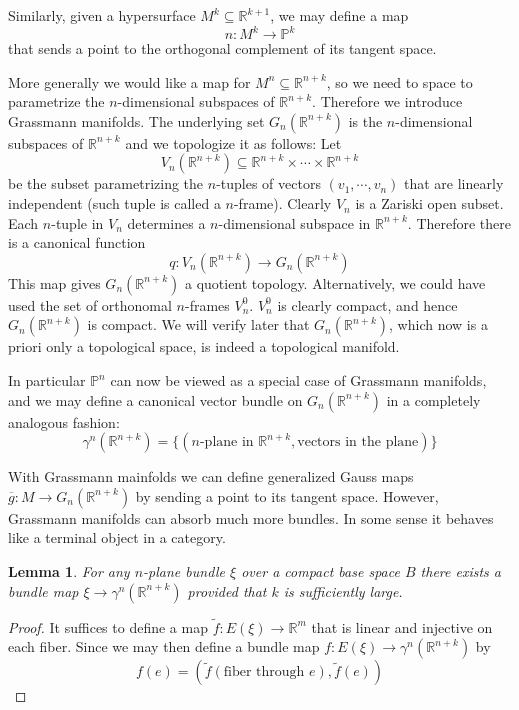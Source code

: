 \documentclass[12pt]{article}
\theoremstyle{plain}
\newtheorem{lemma}[equation]{Lemma}
\theoremstyle{definition}
\newcommand{\IP}{\mathbb{P}}
\newcommand{\IR}{\mathbb{R}}
\newcommand{\<}{\langle}
\renewcommand{\>}{\rangle}
\def\wt{\widetilde}
\newcommand{\wb}{\overline}
\newcommand{\tG}{G_n(\IR^{n + k})}
\begin{document}
Similarly, given a hypersurface $M^k \subseteq \IR^{k + 1}$, we may define a map $$ n : M^k \to \IP^k$$ that sends a point to the orthogonal complement of its tangent space. 

More generally we would like a map for $M^n \subseteq \IR^{n + k}$, so we need to space to parametrize the $n$-dimensional subspaces of $\IR^{n + k}$. Therefore we introduce Grassmann manifolds. The underlying set $G_n(\IR^{n + k})$ is the $n$-dimensional subspaces of $\IR^{n + k}$ and we topologize it as follows: Let $$V_n(\IR^{n + k}) \subseteq \IR^{n + k} \times \cdots \times \IR^{n + k}$$ be the subset parametrizing the $n$-tuples of vectors $(v_1, \cdots, v_n)$ that are linearly independent (such tuple is called a $n$-frame). Clearly $V_n$ is a Zariski open subset. Each $n$-tuple in $V_n$ determines a $n$-dimensional subspace in $\IR^{n + k}$. Therefore there is a canonical function 
$$ q : V_n(\IR^{n + k}) \to G_n (\IR^{n + k}) $$ 
This map gives $G_n (\IR^{n + k})$ a quotient topology. Alternatively, we could have used the set of orthonomal $n$-frames $V^0_{n}$. $V^0_{n}$ is clearly compact, and hence $G_n (\IR^{n + k})$ is compact. We will verify later that $G_n (\IR^{n + k})$, which now is a priori only a topological space, is indeed a topological manifold. 

In particular $\IP^n$ can now be viewed as a special case of Grassmann manifolds, and we may define a canonical vector bundle on $G_n(\IR^{n + k})$ in a completely analogous fashion: $$\gamma^n(\IR^{n + k}) = \{ (\text{$n$-plane in }\IR^{n + k}, \text{vectors in the plane}) \}$$ 

With Grassmann mainfolds we can define generalized Gauss maps $\wb{g} : M \to \tG$ by sending a point to its tangent space. However, Grassmann manifolds can absorb much more bundles. In some sense it behaves like a terminal object in a category. 

\begin{lemma}
\label{complemma}
For any $n$-plane bundle $\xi$ over a compact base space $B$ there exists a bundle map $\xi \to \gamma^n(\IR^{n + k})$ provided that $k$ is sufficiently large. 
\end{lemma}
\begin{proof}
It suffices to define a map $\wt{f} : E(\xi) \to \IR^m$ that is linear and injective on each fiber. Since we may then define a bundle map $f : E(\xi) \to \gamma^n(\IR^{n + k})$ by 
$$ f(e) = ( \wt{f}(\text{fiber through }e), \wt{f}(e) )$$

\end{proof}
\end{document}
